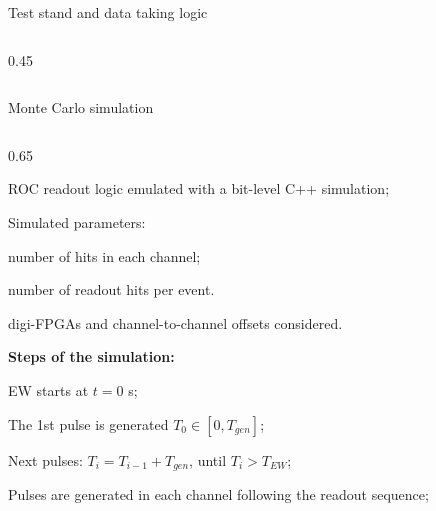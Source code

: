 \documentclass{beamer}
\begin{document}
\begin{frame}{Test stand and data taking logic}
\begin{columns}
\begin{column}{0.45\framewidth}
\begin{figure}[H]
        \label{fig:enter-label} 
    \end{figure}
\end{column}
\end{columns}




          \end{frame}




\begin{frame}{Monte Carlo simulation}


   \vspace{-3mm}
   \begin{columns}
 \begin{column}{0.65\framewidth} 

       \begin{itemize}
       {\footnotesize
           \item ROC readout logic emulated with a bit-level C++ simulation;
           \vspace{0.8mm}
           \item Simulated parameters:
          \vspace{0.8mm}
           \begin{itemize}
            {\footnotesize  \item number of hits in each channel;
               \item number of readout hits per event.}
           \end{itemize}
          \vspace{0.8mm}
           \item digi-FPGAs and channel-to-channel offsets considered. }
       \end{itemize}
      \vspace{0.8mm}
      {\footnotesize  \textbf{Steps of the simulation:}}
     \vspace{0.8mm}
\begin{itemize}
{\footnotesize
\item EW starts at $t=0$ s;
\vspace{0.8mm}
 \item The 1st pulse is generated $T_0\in [0 ,T_{gen}]$;
\vspace{0.8mm}
   \item Next pulses: $T_i = T_{i-1} + T_{gen}$, until $T_i> T_{EW}$;
   \vspace{0.8mm}
\item Pulses are generated in each channel following the readout sequence;
\vspace{0.8mm}
}
\end{itemize}
\end{column}
\end{columns}
\end{frame}
\end{document}
